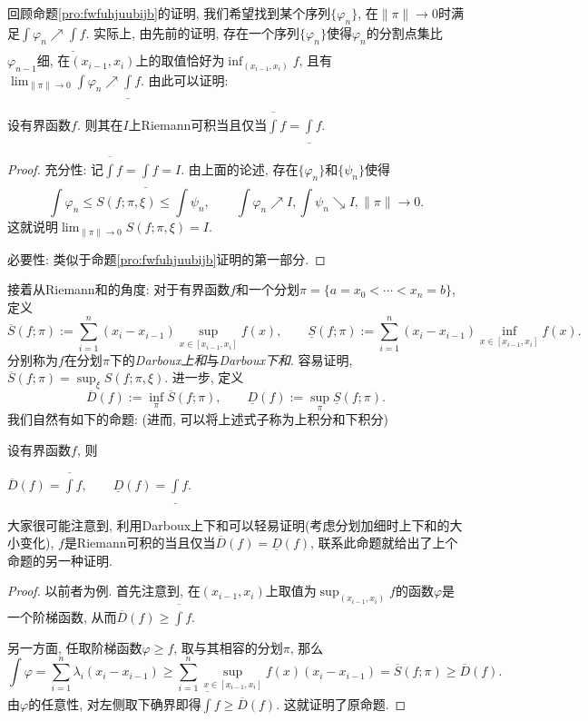 回顾命题\ref{pro:fwfuhjuubijb}的证明, 我们希望找到某个序列$\{ \varphi _n \}$, 在$\| \pi \| \to 0$时满足$\int \varphi _n \nearrow \underline{\int}f$. 实际上, 由先前的证明, 存在一个序列$\{ \varphi _n \}$使得$\varphi _n$的分割点集比$\varphi _{n-1}$细, 在$(x_{i-1},x_i)$上的取值恰好为$\inf_{(x_{i-1},x_i)}f$, 且有$\lim_{\| \pi \|\to 0} \int \varphi _n \nearrow \underline{\int}f$. 由此可以证明: 

\begin{proposition}{}
	设有界函数$f$. 则其在$I$上Riemann可积当且仅当$\overline{\int}f=\underline{\int}f$. 
\end{proposition}
\begin{proof}
	充分性: 记$\overline{\int}f=\underline{\int}f=I$. 由上面的论述, 存在$\{ \varphi _n \}$和$\{ \psi _n \}$使得$$\int \varphi _n \leq S(f;\pi ,\xi) \leq \int \psi _n,\qquad \int \varphi _n \nearrow I, \int \psi _n \searrow I,\| \pi \| \to 0.$$
	这就说明$\lim_{\| \pi \| \to 0}S(f;\pi ,\xi) =I$. 
	
	必要性: 类似于命题\ref{pro:fwfuhjuubijb}证明的第一部分. 
\end{proof}


接着从Riemann和的角度: 对于有界函数$f$和一个分划$\pi =\{ a=x_0<\cdots <x_n=b \}$, 定义$$\overline{S}(f;\pi):=\sum_{i=1}^{n}(x_i-x_{i-1})\sup_{x\in[x_{i-1},x_i]}f(x),\qquad \underline{S}(f;\pi):=\sum_{i=1}^{n}(x_i-x_{i-1})\inf_{x\in[x_{i-1},x_i]}f(x).$$
分别称为$f$在分划$\pi$下的\textit{Darboux上和}与\textit{Darboux下和}. 容易证明, $\overline{S}(f;\pi) = \sup_{\xi} S(f;\pi,\xi)$. 进一步, 定义$$\overline{D}(f) := \inf_{\pi} \overline{S}(f;\pi),\qquad \underline{D}(f) := \sup_{\pi} \underline{S}(f;\pi).$$
我们自然有如下的命题: (进而, 可以将上述式子称为上积分和下积分)

\begin{proposition}{}
	设有界函数$f$, 则
	\begin{center}
		$\displaystyle \overline{D}(f) = \overline{\int}f,\qquad \underline{D}(f) = \underline{\int}f.$
	\end{center}
\end{proposition}
\begin{remark}
	大家很可能注意到, 利用Darboux上下和可以轻易证明(考虑分划加细时上下和的大小变化), $f$是Riemann可积的当且仅当$\overline{D}(f)=\underline{D}(f)$, 联系此命题就给出了上个命题的另一种证明. 
\end{remark}
\begin{proof}
	以前者为例. 首先注意到, 在$(x_{i-1},x_i)$上取值为$\sup_{(x_{i-1},x_i)}f$的函数$\varphi$是一个阶梯函数, 从而$\overline{D}(f) \geq \overline{\int}f$. 
	
	另一方面, 任取阶梯函数$\varphi \geq f$, 取与其相容的分划$\pi$, 那么$$\int \varphi = \sum_{i=1}^{n} \lambda _i (x_i-x_{i-1}) \geq \sum_{i=1}^{n} \sup_{x\in[x_{i-1},x_i]}f(x) (x_i-x_{i-1}) = \overline{S}(f;\pi) \geq \overline{D}(f).$$
	 由$\varphi$的任意性, 对左侧取下确界即得$\overline{\int}f \geq \overline{D}(f)$. 这就证明了原命题. 
\end{proof}

